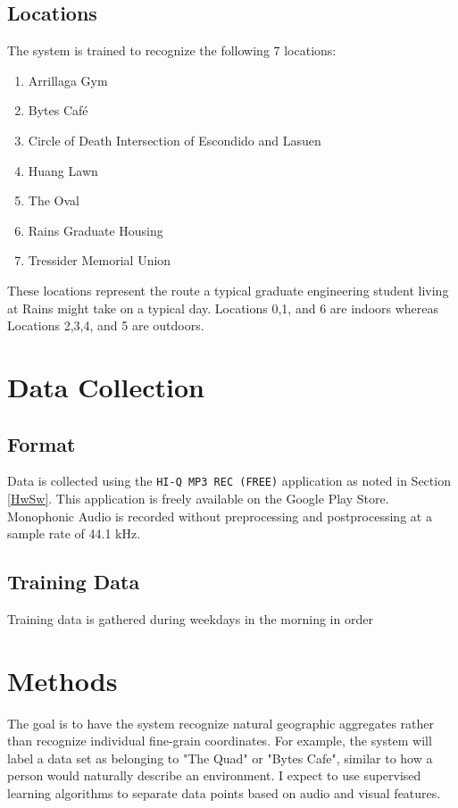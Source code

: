 \documentclass[journal]{IEEEtran}
\begin{document}
\subsection{Locations}
The system is trained to recognize the following 7 locations:
\begin{enumerate}[label=\arabic*.]
\addtocounter{enumi}{-1}
\item Arrillaga Gym
\item Bytes Caf\'e
\item Circle of Death
    \subitem Intersection of Escondido and Lasuen
\item Huang Lawn
\item The Oval
\item Rains Graduate Housing
\item Tressider Memorial Union
\end{enumerate}
These locations represent the route a typical graduate engineering student living at Rains might take on a typical day. Locations 0,1, and 6 are indoors whereas Locations 2,3,4, and 5 are outdoors.


\section{Data Collection}\label{Data}
\subsection{Format}
Data is collected using the \texttt{HI-Q MP3 REC (FREE)} application as noted in Section \ref{HwSw}. This application is freely available on the Google Play Store. Monophonic Audio is recorded without preprocessing and postprocessing at a sample rate of 44.1 kHz. 
\subsection{Training Data}
Training data is gathered during weekdays in the morning in order

\section{Methods}
The goal is to have the system recognize natural geographic aggregates rather than recognize individual fine-grain coordinates. For example, the system will label a data set as belonging to "The Quad" or "Bytes Cafe", similar to how a person would naturally describe an environment. I expect to use supervised learning algorithms to separate data points based on audio and visual features.
\end{document}
